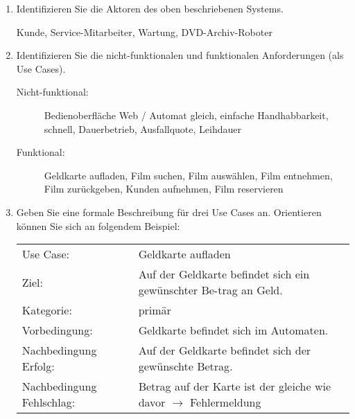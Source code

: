 \documentclass{lehramt-informatik}
\begin{document}
\begin{enumerate}


\item Identifizieren Sie die Aktoren des oben beschriebenen Systems.

\begin{antwort}
Kunde, Service-Mitarbeiter, Wartung, DVD-Archiv-Roboter
\end{antwort}


\item Identifizieren Sie die nicht-funktionalen und funktionalen
Anforderungen (als Use Cases).

\begin{antwort}
\begin{description}
\item[Nicht-funktional:] Bedienoberfläche Web / Automat gleich, einfache
Handhabbarkeit, schnell, Dauerbetrieb, Ausfallquote, Leihdauer

\item[Funktional:] Geldkarte aufladen, Film suchen, Film auswählen, Film
entnehmen, Film zurückgeben, Kunden aufnehmen, Film reservieren
\end{description}
\end{antwort}

\item Geben Sie eine formale Beschreibung für drei Use Cases an.
Orientieren können Sie sich an folgendem Beispiel:

\begin{antwort}

\begin{tabularx}{\linewidth}{p{3cm}X}
Use Case: &
Geldkarte aufladen \\

Ziel: &
Auf der Geldkarte befindet sich ein gewünschter Be-trag an Geld. \\

Kategorie: & primär \\

Vorbedingung: & Geldkarte befindet sich im Automaten. \\

Nachbedingung Erfolg: &
Auf der Geldkarte befindet sich der gewünschte Betrag. \\

Nachbedingung Fehlschlag: &
Betrag auf der Karte ist der gleiche wie davor  $\rightarrow$
Fehlermeldung \\


\end{tabularx}
\end{antwort}
\end{enumerate}
\end{document}
